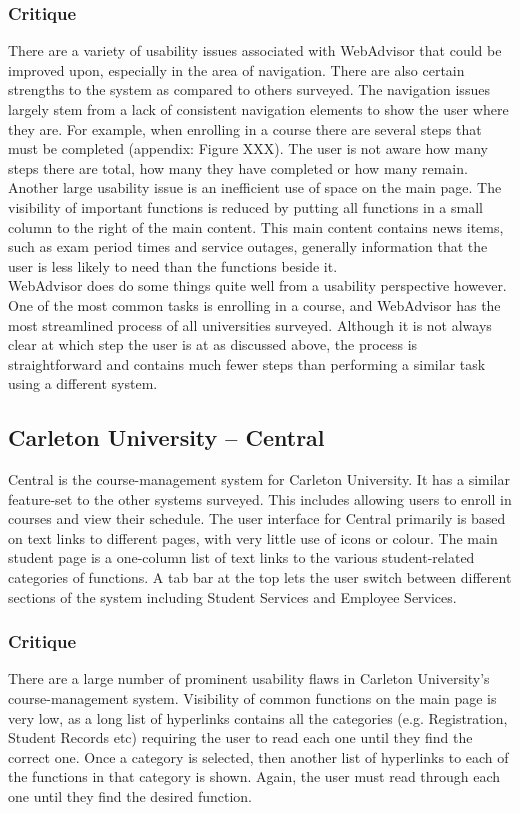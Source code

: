 \documentclass[10pt]{article}
\begin{document}
\begin{multicols}{2}
\subsubsection*{Critique}
There are a variety of usability issues associated with \mbox{WebAdvisor} that 
could be improved upon, especially in the area of navigation. There are also 
certain strengths to the system as compared to others surveyed. The navigation 
issues largely stem from a lack of consistent navigation elements to show the 
user where they are. For example, when enrolling in a course there are several 
steps that must be completed (appendix: Figure XXX). The user is not aware how many steps there are total, how many they 
have completed or how many remain. Another large usability issue is an 
inefficient use of space on the main page. The visibility of important functions 
is reduced by putting all functions in a small column to the right of the main 
content. This main content contains news items, such as exam period times and 
service outages, generally information that the user is less likely to need than 
the functions beside it.\\

WebAdvisor does do some things quite well from a usability perspective however. 
One of the most common tasks is enrolling in a course, and WebAdvisor has the 
most streamlined process of all universities surveyed. Although it is not always 
clear at which step the user is at as discussed above, the process is 
straightforward and contains much fewer steps than performing a similar task 
using a different system.

\subsection*{Carleton University -- Central}
Central is the course-management system for Carleton University. It has a 
similar feature-set to the other systems surveyed. This includes allowing users 
to enroll in courses and view their schedule. The user interface for Central 
primarily is based on text links to different pages, with very little use of 
icons or colour. The main student page is a one-column list of text links to the 
various student-related categories of functions. A tab bar at the top lets the 
user switch between different sections of the system including Student Services 
and Employee Services.

\subsubsection*{Critique}
There are a large number of prominent usability flaws in Carleton University's 
course-management system. Visibility of common functions on the main 
page is very low, as a long list of hyperlinks contains all the categories (e.g. 
Registration, Student Records etc) requiring the user to read each one until 
they find the correct one. Once a category is selected, then another list of 
hyperlinks to each of the functions in that category is shown. 
Again, the user must read through each one until they find the desired function.\\


\end{multicols}
\end{document}
